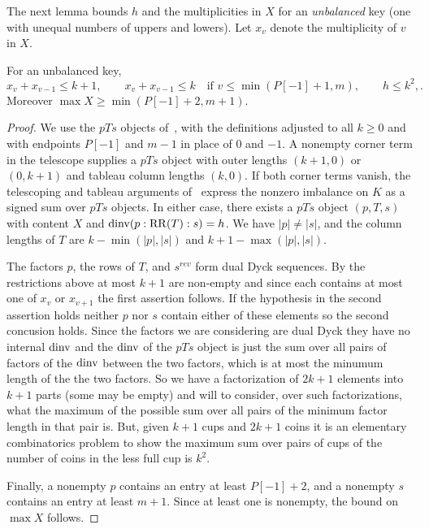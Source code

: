\documentclass[11pt]{article}
\begin{document}
The next lemma bounds $h$ and the multiplicities in $X$ for an \emph{unbalanced} key (one with unequal numbers of uppers and lowers). Let $x_v$ denote the multiplicity of $v$ in $X$.
\begin{lemma}\label{bounds}
For an unbalanced key,
\[
x_v+x_{v-1}\le k+1,\qquad
 x_v+x_{v-1}\le k\quad\text{if }v\le\min(P[-1]+1,m), \qquad   h\le k^2,.
\]
Moreover $\max X\ge\min(P[-1]+2,m+1)$.
\end{lemma}
\begin{proof}
We use the $pTs$ objects of~\cite[\S3.3]{H}, with the definitions adjusted to all $k\ge0$ and with endpoints $P[-1]$ and $m-1$ in place of $0$ and $-1$. A nonempty corner term in the telescope supplies a $pTs$ object with outer lengths $(k+1,0)$ or $(0,k+1)$ and tableau column lengths $(k,0)$. If both corner terms vanish, the telescoping and tableau arguments of~\cite[\S3.2, Lemma~3.4, and Corollary~3.5]{H} express the nonzero imbalance on $K$ as a signed sum over $pTs$ objects. In either case, there exists a $pTs$ object $(p,T,s)$ with content $X$ and $\operatorname{dinv}(p:\mathrm{RR}(T):s)=h$. We have $|p|\ne|s|$, and the column lengths of $T$ are $k-\min(|p|,|s|)$ and $k+1-\max(|p|,|s|)$.

The factors $p$, the rows of $T$, and $s^{rev}$ form dual Dyck sequences.  By the restrictions above at most $k+1$ are non-empty and since each contains at most one of $x_v$ or $x_{v+1}$ the first assertion follows. If the hypothesis in the second assertion holds neither $p$ nor $s$ contain either of these elements so the second concusion holds. Since the factors we are considering are dual Dyck they have no internal $\operatorname{dinv}$ and the $\operatorname{dinv}$ of the $pTs$ object is just the sum over all pairs of factors of the $\operatorname{dinv}$ between the two factors, which is at most the minumum length of the the two factors.  So we have a factorization of $2k+1$ elements into $k+1$ parts (some may be empty) and will to consider, over such factorizations, what the maximum of the possible sum over all pairs of the minimum factor length in that pair is.  But, given $k+1$ cups and $2k+1$ coins it is an elementary combinatorics problem to show the maximum sum over pairs of cups of the number of coins in the less full cup is $k^2$.  

Finally, a nonempty $p$ contains an entry at least $P[-1]+2$, and a nonempty $s$ contains an entry at least $m+1$. Since at least one is nonempty, the bound on $\max X$ follows.

\end{proof}
\end{document}
